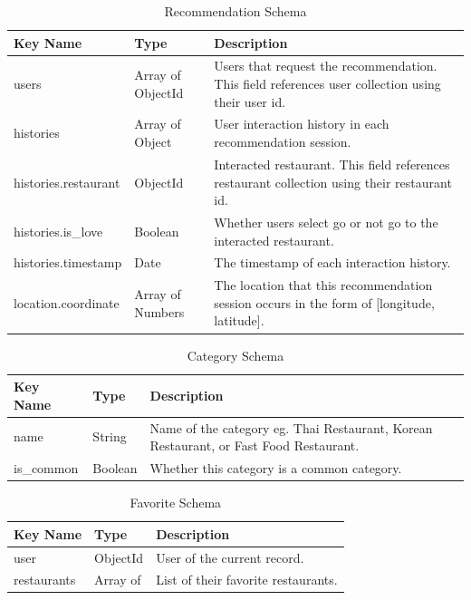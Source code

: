 \documentclass[12pt,oneside,openright,a4paper]{cpe-english-project}
\begin{document}
\begin{table}[!h]
\caption{Recommendation Schema}\label{tbl:3RecommendationSchema}
\begin{tabularx}{\textwidth}{l|l|X} \hline\hline
Key Name & Type & Description \\ \hline\hline
users & Array of ObjectId & Users that request the recommendation. This field references user collection using their user id. \\ \hline
histories & Array of Object & User interaction history in each recommendation session. \\ \hline
histories.restaurant & ObjectId & Interacted restaurant. This field references restaurant collection using their restaurant id. \\ \hline
histories.is\_love & Boolean & Whether users select go or not go to the interacted restaurant. \\ \hline
histories.timestamp & Date & The timestamp of each interaction history. \\ \hline
location.coordinate & Array of Numbers & The location that this recommendation session occurs in the form of [longitude, latitude]. \\ \hline\hline
\end{tabularx}
\end{table}

\begin{table}[!h]
\caption{Category Schema}\label{tbl:3CategorySchema}
\begin{tabularx}{\textwidth}{l|l|X} \hline\hline
Key Name & Type & Description \\ \hline\hline
name & String & Name of the category eg. Thai Restaurant, Korean Restaurant, or Fast Food Restaurant. \\ \hline
is\_common & Boolean & Whether this category is a common category. \\ \hline\hline
\end{tabularx}
\end{table}

\begin{table}[!h]
\caption{Favorite Schema}\label{tbl:3FavoriteSchema}
\begin{tabularx}{\textwidth}{l|l|X} \hline\hline
Key Name & Type & Description \\ \hline\hline
user & ObjectId & User of the current record. \\ \hline
restaurants & Array of & List of their favorite restaurants. \\ \hline\hline
\end{tabularx}
\end{table}
\end{document}
